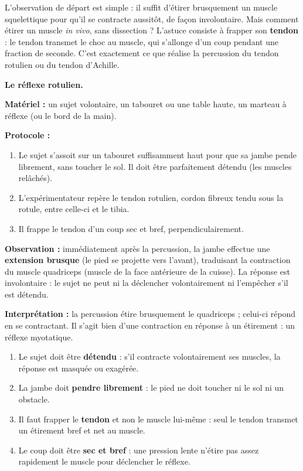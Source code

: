 \documentclass[11pt]{article}
\newcommand{\cle}[1]{{\popxbold\color{popdark}#1}}
\newcounter{popsec}
\newcounter{popsub}
\newcommand{\courssub}[1]{%
  \stepcounter{popsub}%
  \par\vspace{9pt}\noindent{\popxbold\fontsize{11.5}{13}\selectfont\color{popink}{\color{poporange}\thepopsec.\thepopsub}\hspace{6pt}#1}\par\nopagebreak\vspace{4pt}
}
\begin{document}
L'observation de départ est simple : il suffit d'étirer brusquement un muscle squelettique pour qu'il se contracte aussitôt, de façon involontaire. Mais comment étirer un muscle \emph{in vivo}, sans dissection ? L'astuce consiste à frapper son \textbf{tendon} : le tendon transmet le choc au muscle, qui s'allonge d'un coup pendant une fraction de seconde. C'est exactement ce que réalise la percussion du tendon rotulien ou du tendon d'Achille.

\courssub{Mise en évidence expérimentale}

\textbf{Le réflexe rotulien.}\par

\begin{experience}
\textbf{Matériel :} un sujet volontaire, un tabouret ou une table haute, un marteau à réflexe (ou le bord de la main).

\textbf{Protocole :}
\begin{enumerate}
\item Le sujet s'assoit sur un tabouret suffisamment haut pour que sa jambe pende librement, sans toucher le sol. Il doit être parfaitement détendu (les muscles relâchés).
\item L'expérimentateur repère le tendon rotulien, cordon fibreux tendu sous la rotule, entre celle-ci et le tibia.
\item Il frappe le tendon d'un coup sec et bref, perpendiculairement.
\end{enumerate}

\textbf{Observation :} immédiatement après la percussion, la jambe effectue une \textbf{extension brusque} (le pied se projette vers l'avant), traduisant la contraction du muscle \cle{quadriceps} (muscle de la face antérieure de la cuisse). La réponse est involontaire : le sujet ne peut ni la déclencher volontairement ni l'empêcher s'il est détendu.

\textbf{Interprétation :} la percussion étire brusquement le quadriceps ; celui-ci répond en se contractant. Il s'agit bien d'une contraction en réponse à un étirement : un réflexe myotatique.
\end{experience}

\begin{methode}
\begin{enumerate}
\item Le sujet doit être \textbf{détendu} : s'il contracte volontairement ses muscles, la réponse est masquée ou exagérée.
\item La jambe doit \textbf{pendre librement} : le pied ne doit toucher ni le sol ni un obstacle.
\item Il faut frapper le \textbf{tendon} et non le muscle lui-même : seul le tendon transmet un étirement bref et net au muscle.
\item Le coup doit être \textbf{sec et bref} : une pression lente n'étire pas assez rapidement le muscle pour déclencher le réflexe.
\end{enumerate}
\end{methode}
\end{document}

